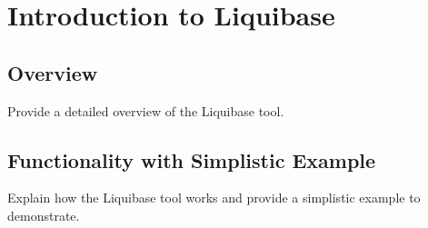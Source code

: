 

\chapter{Introduction to Liquibase}
\section{Overview}
Provide a detailed overview of the Liquibase tool.

\section{Functionality with Simplistic Example}
Explain how the Liquibase tool works and provide a simplistic example to demonstrate.







\newpage